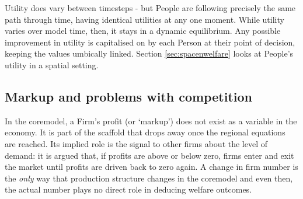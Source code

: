 Utility does vary between timesteps - but People are following precisely the same path through time, having identical utilities at any one moment. While utility varies over model time, then, it stays in a dynamic equilibrium. Any possible improvement in utility is capitalised on by each Person at their point of decision, keeping the values umbically linked. Section \ref{sec:spacenwelfare} looks at People's utility in a spatial setting.

\subsection{Markup and problems with competition \label{sec:markup}}

In the \gls{coremodel}, a Firm's profit (or `markup') does not exist as a variable in the economy. It is part of the scaffold that drops away once the regional equations are reached. Its implied role is the signal to other firms about the level of demand: it is argued that, if profits are above or below zero, firms enter and exit the market until profits are driven back to zero again. A change in firm number is the \emph{only} way that production structure changes in the \gls{coremodel} and even then, the actual number plays no direct role in deducing welfare outcomes. 

